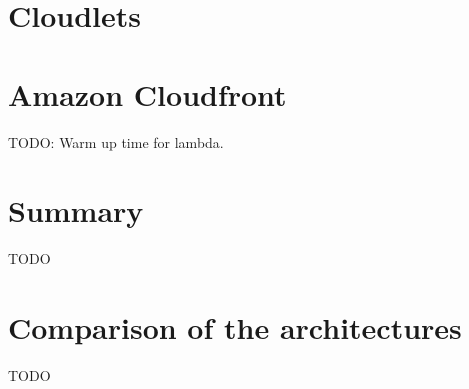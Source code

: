 






\section{Cloudlets}







\section{Amazon Cloudfront}
TODO: Warm up time for lambda.
\section{Summary}
TODO

\section{Comparison of the architectures}
TODO